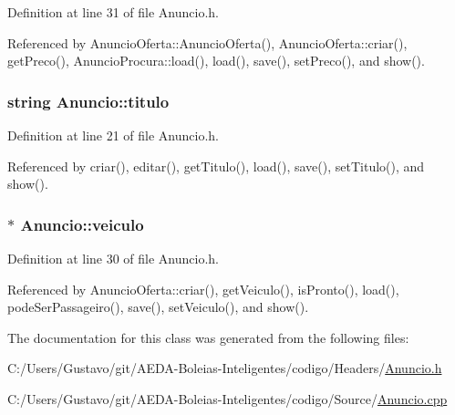 Definition at line 31 of file Anuncio.\+h.



Referenced by Anuncio\+Oferta\+::\+Anuncio\+Oferta(), Anuncio\+Oferta\+::criar(), get\+Preco(), Anuncio\+Procura\+::load(), load(), save(), set\+Preco(), and show().

\hypertarget{class_anuncio_adb34bedd8220f42b9ee37662c21313e6}{
\subsubsection[{titulo}]{\setlength{\rightskip}{0pt plus 5cm}string Anuncio\+::titulo\hspace{0.3cm}{\ttfamily [protected]}}}\label{class_anuncio_adb34bedd8220f42b9ee37662c21313e6}


Definition at line 21 of file Anuncio.\+h.



Referenced by criar(), editar(), get\+Titulo(), load(), save(), set\+Titulo(), and show().

\hypertarget{class_anuncio_a3cffe1ce2024500bddaf07bd0f7ecc81}{
\subsubsection[{veiculo}]{$\ast$ Anuncio\+::veiculo\hspace{0.3cm}{\ttfamily [protected]}}}\label{class_anuncio_a3cffe1ce2024500bddaf07bd0f7ecc81}


Definition at line 30 of file Anuncio.\+h.



Referenced by Anuncio\+Oferta\+::criar(), get\+Veiculo(), is\+Pronto(), load(), pode\+Ser\+Passageiro(), save(), set\+Veiculo(), and show().



The documentation for this class was generated from the following files\+:\begin{DoxyCompactItemize}
\item 
C\+:/\+Users/\+Gustavo/git/\+A\+E\+D\+A-\/\+Boleias-\/\+Inteligentes/codigo/\+Headers/\hyperlink{_anuncio_8h}{Anuncio.\+h}\item 
C\+:/\+Users/\+Gustavo/git/\+A\+E\+D\+A-\/\+Boleias-\/\+Inteligentes/codigo/\+Source/\hyperlink{_anuncio_8cpp}{Anuncio.\+cpp}\end{DoxyCompactItemize}

